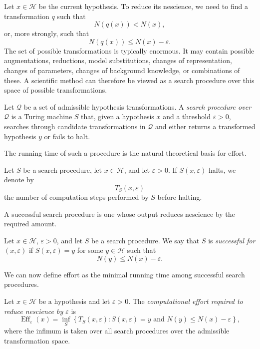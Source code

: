 Let \(x\in\mathcal{H}\) be the current hypothesis. To reduce its nescience, we need to find a transformation \(q\) such that
\[
N(q(x))<N(x),
\]
or, more strongly, such that
\[
N(q(x))\leq N(x)-\varepsilon.
\]
The set of possible transformations is typically enormous. It may contain possible augmentations, reductions, model substitutions, changes of representation, changes of parameters, changes of background knowledge, or combinations of these. A scientific method can therefore be viewed as a search procedure over this space of possible transformations.

\begin{definition}
Let \(\mathcal{Q}\) be a set of admissible hypothesis transformations. A \emph{search procedure over \(\mathcal{Q}\)} is a Turing machine \(S\) that, given a hypothesis \(x\) and a threshold \(\varepsilon>0\), searches through candidate transformations in \(\mathcal{Q}\) and either returns a transformed hypothesis \(y\) or fails to halt.
\end{definition}

The running time of such a procedure is the natural theoretical basis for effort.

\begin{definition}
Let \(S\) be a search procedure, let \(x\in\mathcal{H}\), and let \(\varepsilon>0\). If \(S(x,\varepsilon)\) halts, we denote by
\[
T_S(x,\varepsilon)
\]
the number of computation steps performed by \(S\) before halting.
\end{definition}

A successful search procedure is one whose output reduces nescience by the required amount.

\begin{definition}
Let \(x\in\mathcal{H}\), \(\varepsilon>0\), and let \(S\) be a search procedure. We say that \(S\) is \emph{successful for \((x,\varepsilon)\)} if \(S(x,\varepsilon)=y\) for some \(y\in\mathcal{H}\) such that
\[
N(y)\leq N(x)-\varepsilon.
\]
\end{definition}

We can now define effort as the minimal running time among successful search procedures.

\begin{definition}
Let \(x\in\mathcal{H}\) be a hypothesis and let \(\varepsilon>0\). The \emph{computational effort required to reduce nescience by \(\varepsilon\)} is
\[
\operatorname{Eff}_{\varepsilon}(x)
=
\inf_{S}
\left\{
T_S(x,\varepsilon):
S(x,\varepsilon)=y
\text{ and }
N(y)\leq N(x)-\varepsilon
\right\},
\]
where the infimum is taken over all search procedures over the admissible transformation space.
\end{definition}

